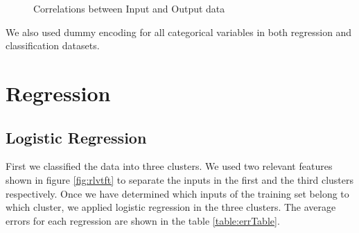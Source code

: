 \documentclass{article} %
\begin{document}
\begin{figure}[!h]
\center
{}
\caption{Correlations between Input and Output data}
\end{figure}

We also used dummy encoding for all categorical variables in both regression and classification datasets.


\section{Regression}

\subsection{Logistic Regression}
First we classified the data into three clusters. We used two relevant features shown in figure \ref{fig:rlvtft} to separate the inputs in the first and the third clusters respectively. Once we have determined which inputs of the training set belong to which cluster, we applied logistic regression in the three clusters. The average errors for each regression are shown in the table \ref{table:errTable}.
\end{document}

